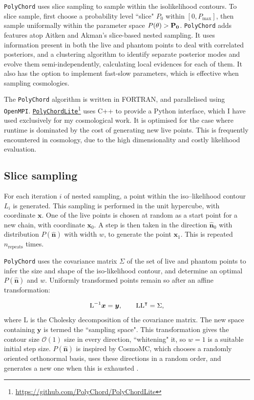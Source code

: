 \documentclass{article}
\begin{document}
\texttt{PolyChord} uses slice sampling to sample within the isolikelihood contours. To slice sample, first choose a probability level ``slice" $P_0$ within $[0, P_\textrm{max}]$, then sample uniformally within the parameter space $P(\bf\theta)>P_0$. \texttt{PolyChord} adds features atop Aitken and Akman's slice-based nested sampling. It uses information present in both the live and phantom points to deal with correlated posteriors, and a clustering algorithm to identify separate posterior modes and evolve them semi-independently, calculating local evidences for each of them. It also has the option to implement fast-slow parameters, which is effective when sampling cosmologies.

The \texttt{PolyChord} algorithm is written in FORTRAN, and parallelised using \texttt{OpenMPI}. \href{https://github.com/PolyChord/PolyChordLite}{\texttt{PolyChordLite}}\footnote{\href{https://github.com/PolyChord/PolyChordLite}{https://github.com/PolyChord/PolyChordLite}} uses C++ to provide a Python interface, which I have used exclusively for my cosmological work. It is optimised for the case where runtime is dominated by the cost of generating new live points. This is frequently encountered in cosmology, due to the high dimensionality and costly likelihood evaluation.

\subsection{Slice sampling}

For each iteration $i$ of nested sampling, a point within the iso--likelihood contour $L_i$ is generated. This sampling is performed in the unit hypercube, with coordinate $\bm x$. One of the live points is chosen at random as a start point for a new chain, with coordinate $\bm x_0$. A step is then taken in the direction $\hat{\bm n}_0$ with distribution $P(\hat{\bm n})$ with width $w$, to generate the point $\bm x_1$. This is repeated $n_\textrm{repeats}$ times.

\texttt{PolyChord} uses the covariance matrix $\Sigma$ of the set of live and phantom points to infer the size and shape of the iso-likelihood contour, and determine an optimal $P(\hat{\bm n})$ and $w$. Uniformly transformed points remain so after an affine transformation:

\begin{equation}
  \textrm{L}^{-1}\bm x = \bm y,\qquad \textrm{LL}^{\intercal} = \Sigma\textrm,
\end{equation}
where $\textrm{L}$ is the Cholesky decomposition of the covariance matrix. The new space containing $\bm y$ is termed the ``sampling space". This transformation gives the contour size $\mathcal{O}(1)$ size in every direction, ``whitening" it, so $w=1$ is a suitable initial step size. 
$P(\hat{\bm n})$ is inspired by CosmoMC, which chooses a randomly oriented orthonormal basis, uses these directions in a random order, and generates a new one when this is exhausted \cite{CosmoMC}.
\end{document}
